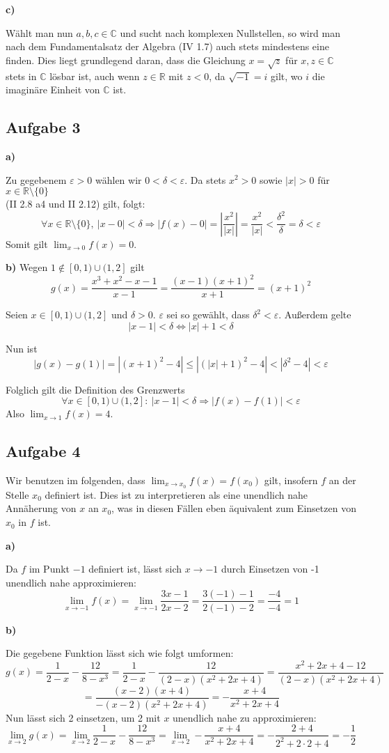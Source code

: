 \documentclass[a4paper,graphics,11pt]{article}
\newcommand{\aufgabe}[1]{\subsection*{Aufgabe #1}}
\begin{document}
\textbf{c)}

Wählt man nun $a,b,c \in \mathbb{C}$ und sucht nach komplexen Nullstellen,
so wird man nach dem Fundamentalsatz der Algebra (IV 1.7) auch stets mindestens eine finden.
Dies liegt grundlegend daran, dass die Gleichung $x = \sqrt{z}$ für $x,z \in \mathbb{C}$
stets in $\mathbb{C}$ lösbar ist, auch wenn $z \in \mathbb{R}$ mit $z < 0$, da $\sqrt{-1} = i$
gilt, wo $i$ die imaginäre Einheit von $\mathbb{C}$ ist.


\aufgabe{3}
\textbf{a)}

Zu gegebenem $\varepsilon > 0$ wählen wir $0 < \delta < \varepsilon$. Da stets
$x^2 > 0$  sowie $|x| > 0$ für $x \in \mathbb{R}\setminus\{0\}$\\
(II 2.8 a4 und II 2.12) gilt, folgt:
$$
    \forall x \in \mathbb{R}\setminus \{0\},\ |x-0| < \delta \Longrightarrow
    |f(x)-0| = \left|\frac{x^2}{|x|}\right| = \frac{x^2}{|x|} < \frac{\delta^2}{\delta} 
    = \delta < \varepsilon
$$
Somit gilt $\lim_{x \to 0}\limits f(x) = 0$.

\textbf{b)}
Wegen $1 \not\in [0,1) \cup (1,2]$ gilt
$$
	g(x) = \frac{x^3+x^2-x-1}{x-1} = \frac{(x-1)(x+1)^2}{x+1} = (x+1)^2
$$

Seien $x \in [0,1) \cup (1,2]$ und $\delta > 0$. $\varepsilon$ sei so gewählt, dass $\delta^2 < \varepsilon$. Außerdem gelte
$$
	|x-1| < \delta
	\Leftrightarrow |x| + 1 < \delta
$$

Nun ist
$$
	|g(x) - g(1)| = |(x+1)^2 - 4| \leq |(|x|+1)^2 - 4| < |\delta^2 - 4| < \varepsilon
$$

Folglich gilt die Definition des Grenzwerts
$$
	\forall x \in [0,1) \cup (1,2]:\ |x-1| < \delta \Rightarrow |f(x)-f(1)| < \varepsilon
$$
Also $\lim_{x \to 1}\limits f(x) = 4$.

\newpage
\aufgabe{4}
Wir benutzen im folgenden, dass $\lim_{x \to x_0}\limits f(x) = f(x_0)$ gilt, insofern $f$ an
der Stelle $x_0$ definiert ist. Dies ist zu interpretieren als eine unendlich nahe
Annäherung von $x$ an $x_0$, was in diesen Fällen eben äquivalent zum Einsetzen von $x_0$ in
$f$ ist.

\textbf{a)}

Da $f$ im Punkt $-1$ definiert ist, lässt sich $x\to-1$ durch Einsetzen von -1 unendlich
nahe approximieren:
$$
    \lim_{x \to -1} f(x)
    = \lim_{x \to -1} \frac{3x-1}{2x-2}
    = \frac{3(-1)-1}{2(-1)-2} 
    = \frac{-4}{-4}
    = 1
$$

\textbf{b)}

Die gegebene Funktion lässt sich wie folgt umformen:
$$
    g(x) = \frac{1}{2-x} - \frac{12}{8-x^3}
    = \frac{1}{2-x} - \frac{12}{(2-x)(x^2+2x+4)} 
    = \frac{x^2+2x+4-12}{(2-x)(x^2+2x+4)}
$$$$
    = \frac{(x-2)(x+4)}{-(x-2)(x^2+2x+4)}
    = -\frac{x+4}{x^2+2x+4}
$$
Nun lässt sich 2 einsetzen, um 2 mit $x$ unendlich nahe zu approximieren:
$$
    \lim_{x \to 2} g(x)
    = \lim_{x \to 2} \frac{1}{2-x} - \frac{12}{8-x^3}
    = \lim_{x \to 2} -\frac{x+4}{x^2+2x+4}
    = - \frac{2+4}{2^2+2\cdot 2 +4}
    = -\frac{1}{2}
$$
\end{document}
